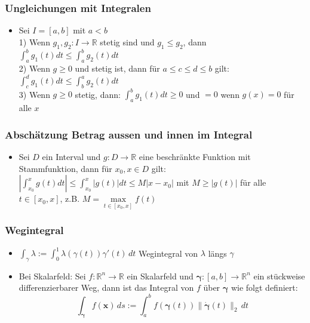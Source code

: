\documentclass[a3paper, 11pt, landscape]{scrartcl}
\begin{document}
\begin{multicols*}{3}
\begin{itemize}
	\end{itemize}
	
	\subsubsection{Ungleichungen mit Integralen}
	\begin{itemize}
	    \item Sei $I=[a,b]$ mit $a < b$\\
	    1) Wenn $g_1,g_2:I\to\mathbb{R}$ stetig sind und $g_1 \leq g_2$, dann $\int_{a}^{b} g_{1}(t) d t \leqslant \int_{a}^{b} g_{2}(t) d t$\\
	    2) Wenn $g\geq 0$ und stetig ist, dann für $a \leq c \leq d \leq b$ gilt: $\int_{c}^{d} g_{1}(t) d t \leqslant \int_{b}^{a} g_{2}(t) d t$\\
	    3) Wenn $g\geq 0$ stetig, dann: $\int_{a}^{b} g_{1}(t) d t \geq 0$ und $=0$ wenn $g(x)=0$ für alle $x$
	\end{itemize}
	
	\subsubsection{Abschätzung Betrag aussen und innen im Integral}
	\begin{itemize}
	    \item Sei $D$ ein Interval und $g:D\to\mathbb{R}$ eine beschränkte Funktion mit Stammfunktion, dann für $x_0, x\in D$ gilt:\\
	    $|\int_{x_0}^x g(t)dt|\leq\int_{x_0}^x |g(t)|dt\leq M |x-x_0|$ mit $M \geq |g(t)|$ für alle $t \in [x_0,x]$, z.B. $M=\max\limits_{t\in[x_0,x]} f(t)$
	\end{itemize}
	
	\subsubsection{Wegintegral}
	\begin{itemize}
	    \item $\int_\gamma \lambda := \int_0^1 \lambda(\gamma(t))\gamma'(t)\,dt$ Wegintegral von $\lambda$ längs $\gamma$
	    \item Bei Skalarfeld: Sei $f: \mathbb{R}^n \rightarrow \mathbb{R}$ ein Skalarfeld und $\bm{\gamma}: [a, b] \rightarrow \mathbb{R}^n$ ein stückweise differenzierbarer Weg, dann ist das Integral von $f$ über $\bm{\gamma}$ wie folgt definiert:
						$$ \int_{\bm{\gamma}} f(\textbf{x}) \,d s := \int _a^b f(\bm{\gamma}(t)) \| \dot{\bm{\gamma}}(t) \| _2 \,d t$$
						

\end{itemize}
\end{multicols*}
\end{document}
